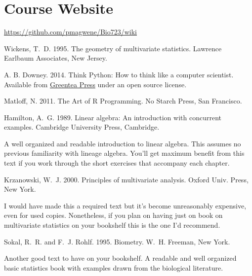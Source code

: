 \documentclass[11pt,letterpaper]{article}
\begin{document}
\section*{Course Website}

\href{https://github.com/pmagwene/Bio723}{https://github.com/pmagwene/Bio723/wiki}

\renewcommand{\refname}{Texts}
\begin{thebibliography}{99}

 Wickens, T.\ D. 1995. The geometry of multivariate statistics. Lawrence Earlbaum Associates, New Jersey.

A. B. Downey. 2014. Think Python: How to think like a computer scientist. Available from \href{http://www.greenteapress.com/thinkpython/thinkpython.html}{Greentea Press} under an open source license.

 Matloff, N. 2011. The Art of R Programming. No Starch Press, San Francisco.



\end{thebibliography}

\renewcommand{\refname}{Other Recommended Texts}

\begin{thebibliography}{99}
\setcounter{enumiv}{5}
 Hamilton, A.\ G. 1989. Linear algebra: An introduction with concurrent examples. Cambridge University Press, Cambridge.

A well organized and readable introduction to linear algebra. This assumes no previous familiarity with lineage algebra.  You'll get maximum benefit from this text if you work through the short exercises that accompany each chapter.

 Krzanowski, W.\ J. 2000. Principles of multivariate analysis. Oxford Univ. Press, New York.

I would have made this a required text but it's become unreasonably expensive, even for used copies. Nonetheless, if you plan on having just on book on multivariate statistics on your bookshelf this is the one I'd recommend.

 Sokal, R.\ R. and F.\ J. Rohlf. 1995. Biometry. W.\ H. Freeman, New York.

Another good text to have on your bookshelf. A readable and well organized basic statistics book with examples drawn from the biological literature.

\end{thebibliography}
\end{document}
